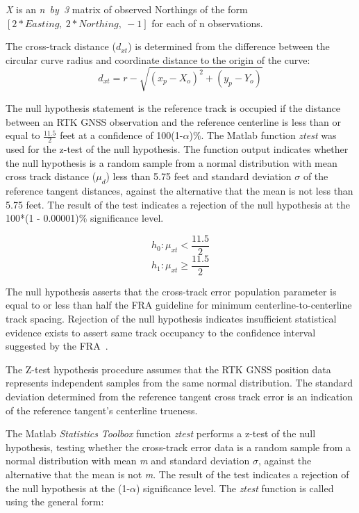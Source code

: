 \emph{X} is an \emph{n~by~3} matrix of observed Northings of the form ${[2*Easting,~2*Northing,~-1]}$ for each of n observations.


The cross-track distance ($d_{xt}$) is determined from the difference between the circular curve radius and coordinate distance to the origin of the curve:
\begin{equation}
\label{crvXtrack}
d_{xt} = r - \sqrt{( x_p - X_o )^2 + (y_p - Y_o)}
\end{equation}

The null hypothesis statement is the reference track is occupied if the distance between an RTK GNSS observation and the reference centerline is less than or equal to $\frac{11.5}{2}$ feet at a confidence of 100(1-${\alpha}$)\%. The Matlab function \emph{ztest}  was used for the z-test of the null hypothesis. The function output indicates whether the null hypothesis is a random sample from a normal distribution with mean cross track distance ($\mu_{d}$) less than 5.75 feet and standard deviation $\sigma$ of the reference tangent distances, against the alternative that the mean is not less than 5.75 feet. The result of the test indicates a rejection of the null hypothesis at the 100*(1 - 0.00001)\% significance level.

\begin{equation}
	h_{0}: \mu_{xt} < \frac{11.5}{2}
\end{equation}
\begin{equation}
	h_{1}: \mu_{xt} \ge \frac{11.5}{2}
\end{equation}

The null hypothesis asserts that the cross-track error population parameter is equal to or less than half the FRA guideline for minimum centerline-to-centerline track spacing. Rejection of the null hypothesis indicates insufficient statistical evidence exists to assert same track occupancy to the confidence interval suggested by the FRA~\citep[pp. 6]{1995FRADiffe}. 

The Z-test hypothesis procedure assumes that the RTK GNSS position data represents independent samples from the same normal distribution. The standard deviation determined from the reference tangent cross track error is an indication of the reference tangent's centerline trueness.  

The Matlab \emph{Statistics Toolbox} function \emph{ztest} performs a z-test of the null hypothesis, testing whether the cross-track error data is a random sample from a normal distribution with mean \emph{m} and standard deviation $\sigma$, against the alternative that the mean is not \emph{m}. The result of the test indicates a rejection of the null hypothesis at the (1-${\alpha}$) significance level. The \emph{ztest} function is called using the general form:

